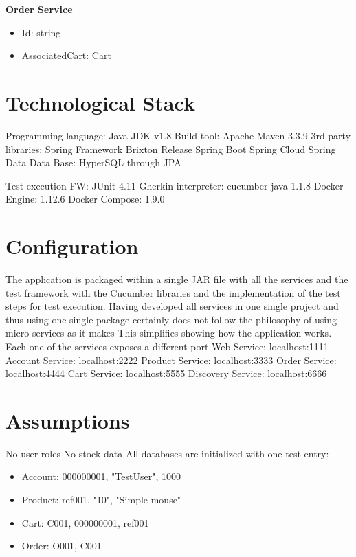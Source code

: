 \textbf{Order Service}
\begin{itemize}
\item Id: string
\item AssociatedCart: Cart\\
\end{itemize}


\section{Technological Stack}
Programming language: Java JDK v1.8
Build tool: Apache Maven 3.3.9
3rd party libraries:
	Spring Framework Brixton Release
		Spring Boot
		Spring Cloud
		Spring Data
	Data Base: HyperSQL through JPA
		
	Test execution FW: JUnit 4.11
	Gherkin interpreter: cucumber-java 1.1.8
Docker Engine: 1.12.6
Docker Compose: 1.9.0

\section{Configuration}
The application is packaged within a single JAR file with all the services and the test framework with the Cucumber libraries and the implementation of the test steps for test execution. Having developed all services in one single project and thus using one single package certainly does not follow the philosophy of using micro services as it makes This simplifies showing how the application works. Each one of the services exposes a different port
Web Service: 				localhost:1111
Account Service: 		localhost:2222
Product Service: 		localhost:3333
Order Service: 			localhost:4444
Cart Service: 			localhost:5555
Discovery Service: 	localhost:6666


\section{Assumptions}
No user roles
No stock data
All databases are initialized with one test entry:

\begin{itemize}
\item Account: 000000001, "TestUser", 1000
\item Product: ref001, "10", "Simple mouse"
\item Cart: C001, 000000001, ref001
\item Order: O001, C001
\end{itemize}
